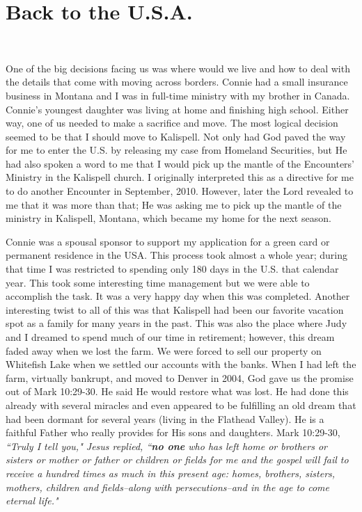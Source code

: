 \documentclass[oneside]{book}
\begin{document}
\section{Back to the U.S.A.}
\

One of the big decisions facing us was where would we live and how to deal with the details that come with moving across borders. Connie had a small insurance business in Montana and I was in full-time ministry with my brother in Canada. Connie's youngest daughter was living at home and finishing high school. Either way, one of us needed to make a sacrifice and move. The most logical decision seemed to be that I should move to Kalispell. Not only had God paved the way for me to enter the U.S. by releasing my case from Homeland Securities, but He had also spoken a word to me that I would pick up the mantle of the Encounters' Ministry in the Kalispell church. I originally interpreted this as a directive for me to do another Encounter in September, 2010. However, later the Lord revealed to me that it was more than that; He was asking me to pick up the mantle of the ministry in Kalispell, Montana, which became my home for the next season.

Connie was a spousal sponsor to support my application for a green card or permanent residence in the USA. This process took almost a whole year; during that time I was restricted to spending only 180 days in the U.S. that calendar year. This took some interesting time management but we were able to accomplish the task. It was a very happy day when this was completed. Another interesting twist to all of this was that Kalispell had been our favorite vacation spot as a family for many years in the past. This was also the place where Judy and I dreamed to spend much of our time in retirement; however, this dream faded away when we lost the farm. We were forced to sell our property on Whitefish Lake when we settled our accounts with the banks. When I had left the farm, virtually bankrupt, and moved to Denver in 2004, God gave us the promise out of Mark 10:29-30. He said He would restore what was lost. He had done this already with several miracles and even appeared to be fulfilling an old dream that had been dormant for several years (living in the Flathead Valley). He is a faithful Father who really provides for His sons and daughters. Mark 10:29-30, \textit{``Truly I tell you," Jesus replied, ``\textbf{no one} who has left home or brothers or sisters or mother or father or children or fields for me and the gospel will fail to receive a hundred times as much in this present age: homes, brothers, sisters, mothers, children and fields--along with persecutions--and in the age to come eternal life."}
\end{document}
